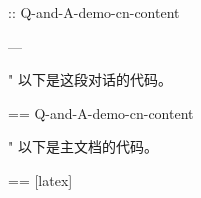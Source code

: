 \documentclass[%
  numbered question,
  numbered answer,
  scroll,
]{Q-and-A}
\begin{document}
:: {Q-and-A-demo-cn-content}


---

"
  以下是这段对话的代码。

  == {Q-and-A-demo-cn-content}

"
  以下是主文档的代码。

  == [latex] {\jobname}
\end{document}
